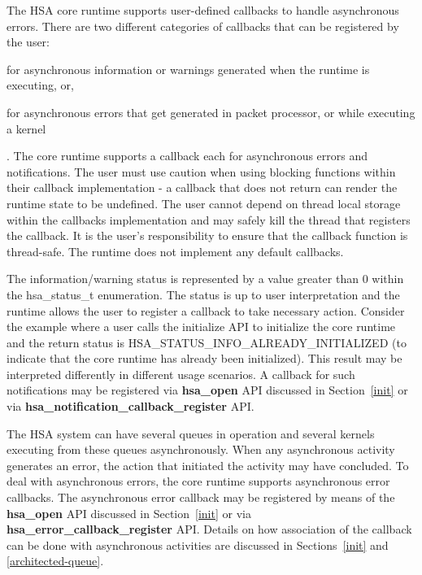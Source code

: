 \documentclass[draft]{book}
\newcommand{\mariotodo}[1]{\todo[color=CarnationPink]{#1}}
\newcommand{\reffun}[1]{\textbf{#1}}
\newcommand{\reftyp}[1]{#1}
\newcommand{\refenu}[1]{\reftyp{#1}}
\begin{document}
The HSA core runtime supports user-defined callbacks to handle asynchronous
errors. There are two different \mariotodo{why separating them?} categories of
callbacks that can be registered by the user: \begin{inparaenum}[(i)] \item for
  asynchronous information or warnings generated when the runtime is executing,
  or, \item for asynchronous errors that get generated in packet processor, or
  while executing a kernel \end{inparaenum}. The core runtime supports a
callback each for asynchronous errors and notifications. The user must use
caution when using blocking functions within their callback implementation - a
callback that does not return can render the runtime state to be undefined. The
user cannot depend on thread local storage within the callbacks implementation
and may safely kill the thread that registers the callback. It is the user's
responsibility to ensure that the callback function is thread-safe. The runtime
does not implement any default callbacks.

The information/warning status is represented by a value greater than 0 within
the \reftyp{hsa_status_t} enumeration. The status is up to user interpretation
and the runtime allows the user to register a callback to take necessary
action. Consider the example where a user calls the initialize API to initialize
the core runtime and the return status is
\refenu{HSA_STATUS_INFO_ALREADY_INITIALIZED} (to indicate that the core
runtime has already been initialized). This result may be interpreted
differently in different usage scenarios. A callback for such notifications may
be registered via \reffun{hsa_open} API discussed in Section~\ref{init} or via
\reffun{hsa_notification_callback_register} API.

The HSA system can have several queues in operation and several kernels
executing from these queues asynchronously. When any asynchronous activity
generates an error, the action that initiated the activity may have
concluded. To deal with asynchronous errors, the core runtime supports
asynchronous error callbacks. The asynchronous error callback may be registered
by means of the \reffun{hsa_open} API discussed in Section~\ref{init} or via
\reffun{hsa_error_callback_register} API. Details on how association of the
callback can be done with asynchronous activities are discussed in
Sections~\ref{init} and \ref{architected-queue}.
\end{document}
